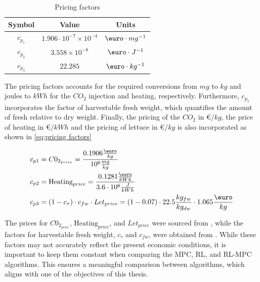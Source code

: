 \begin{table}[H]
	\centering
	\begin{tabular}{|c|c|c|}
		\hline
		\textbf{Symbol} & \textbf{Value} & \textbf{Units} \\
		\hline
		$c_{p_1}$ & $1.906\cdot 10^{-7} \times 10^{-4}$ & $ \text{\euro} \cdot mg^{-1}$ \\
		$c_{p_2}$ & $3.558 \times 10^{-8}$ & $ \text{\euro} \cdot J^{-1}$ \\
		$c_{p_3}$ & $22.285$ & $\text{\euro} \cdot kg^{-1}$ \\ 
		\hline
	\end{tabular}
	\caption{Pricing factors}
	\label{tab:pricing_factors}
\end{table}


The pricing factors accounts for the required conversions from $mg$ to $kg$ and joules to $kWh$ for the $CO_2$ injection and heating, respectively. Furthermore, $c_{p_3}$ incorporates the factor of harvestable fresh weight, which quantifies the amount of fresh relative to dry weight. Finally, the pricing of the $CO_2$ in \euro $/kg$, the price of heating in \euro$/kWh$ and the pricing of lettuce in \euro$/kg$ is also incorporated as shown in \autoref{eq:pricing factors}

\begin{equation}\label{eq:pricing factors}
	\begin{aligned}
		& c_{p1} = C0_{2_{price}}  =  \frac{0.1906 \frac{\text{\euro}}{kg}}{10^{6} \frac{mg}{kg}}\\
		& c_{p2} = \text{Heating}_{price} = \frac{0.1281 \frac{\text{\euro}}{kWh}}{3.6\cdot 10^{6} \frac{J}{kWh}}\\
		& c_{p3} = (1-c_{\tau})  \cdot c_{fw} \cdot Let_{price}= (1-0.07) \cdot 22.5 \frac{kg_{fw}}{kg_{dw}} \cdot 1.065 \frac{\text{\euro}}{kg} \\
	\end{aligned}
\end{equation}

The prices for $C0_{2_{price}}$, $\text{Heating}_{price}$, and $Let_{price}$ were sourced from \cite{vandenbemdRobustDeepReinforcement}, while the factors for harvestable fresh weight, $c_{\tau}$ and $c_{fw}$, were obtained from \cite{hentenGreenhouseClimateManagement1994}. While these factors may not accurately reflect the present economic conditions, it is important to keep them constant when comparing the MPC, RL, and RL-MPC algorithms. This ensures a meaningful comparison between algorithms, which aligns with one of the objectives of this thesis. 


